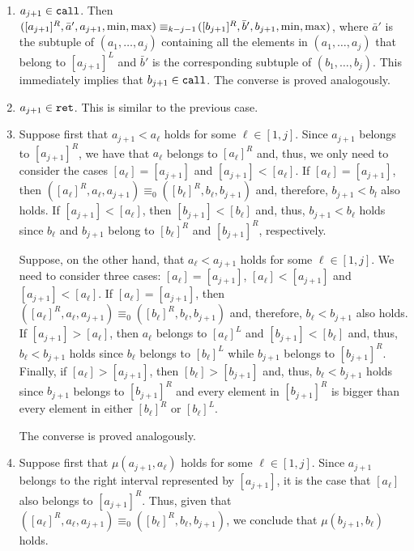 \documentclass{LMCS}
\newcommand{\M}{{\mu}}
\renewcommand{\l}{\ell}
\theoremstyle{plain}
\theoremstyle{definition}
\newcommand{\rett}{{\tt ret}}
\newcommand{\call}{{\tt call}}
\begin{document}
\begin{enumerate}[$\bullet$]

\item $a_{j+1} \in \call$. Then $([a_{j+1}]^R,\bar
a',a_{j+1},{\rm min},{\rm max}) \equiv_{k - j-1}\!([b_{j+1}]^R,\bar
b',b_{j+1},{\rm min},{\rm max})$, where $\bar a'$ is the subtuple of $(a_1,
\ldots, a_j)$ containing all the elements in $(a_1,\dots,a_j)$ that
belong to $[a_{j+1}]^L$ and $\bar b'$ is the corresponding subtuple of
$(b_1,\dots,b_j)$. This immediately implies that $b_{j+1} \in
\call$. The converse is proved analogously.

\item $a_{j+1} \in \rett$. This is similar to the previous
  case. 

\item Suppose first that $a_{j+1} < a_\l$ holds for some $\l \in
[1,j]$. Since $a_{j+1}$ belongs to $[a_{j+1}]^R$, we have that $a_\l$
belongs to $[a_\l]^R$ and, thus, we only need to consider the cases
$[a_\l] = [a_{j+1}]$ and $[a_{j+1}] < [a_\l]$. If $[a_\l] =
[a_{j+1}]$, then $([a_\l]^R,a_\l,a_{j+1}) \equiv_{0}
([b_\l]^R,b_\l,b_{j+1})$ and, therefore, $b_{j+1} < b_l$ also
holds. If $[a_{j+1}] < [a_\l]$, then $[b_{j+1}] < [b_\l]$ and, thus,
$b_{j+1} < b_\l$ holds since $b_\l$ and $b_{j+1}$ belong to $[b_\l]^R$
and $[b_{j+1}]^R$, respectively. 

Suppose, on the other hand, that $a_\l < a_{j+1}$ holds for some $\l
\in [1,j]$. We need to consider three cases: $[a_\l] = [a_{j+1}]$,
$[a_\l] < [a_{j+1}]$ and $[a_{j+1}] < [a_\l]$. If $[a_\l] =
[a_{j+1}]$, then $([a_\l]^R,a_\l,a_{j+1}) \equiv_{0}
([b_\l]^R,b_\l,b_{j+1})$ and, therefore, $b_\l < b_{j+1}$ also
holds. If $[a_{j+1}] > [a_\l]$, then $a_\l$ belongs to $[a_\l]^L$ and
$[b_{j+1}] < [b_\l]$ and, thus, $b_\l < b_{j+1}$ holds since $b_\l$
belongs to $[b_\l]^L$ while $b_{j+1}$ belongs to
$[b_{j+1}]^R$. Finally, if $[a_\l] > [a_{j+1}]$, then $[b_\l] >
[b_{j+1}]$ and, thus, $b_\l < b_{j+1}$ holds since $b_{j+1}$ belongs
to $[b_{j+1}]^R$ and every element in $[b_{j+1}]^R$ is bigger than
every element in either $[b_\l]^R$ or $[b_\l]^L$.

The converse is proved analogously. 

\item Suppose first that $\M(a_{j+1},a_\l)$ holds for some $\l \in
[1,j]$.  Since $a_{j+1}$ belongs to the right interval represented by
$[a_{j+1}]$, it is the case that $[a_\l]$ also belongs to
$[a_{j+1}]^R$. Thus, given that $([a_\l]^R,a_\l,a_{j+1}) \equiv_{0}
([b_\l]^R,b_\l,b_{j+1})$, we conclude that $\M(b_{j+1},b_\l)$ holds.


\end{enumerate}
\end{document}

